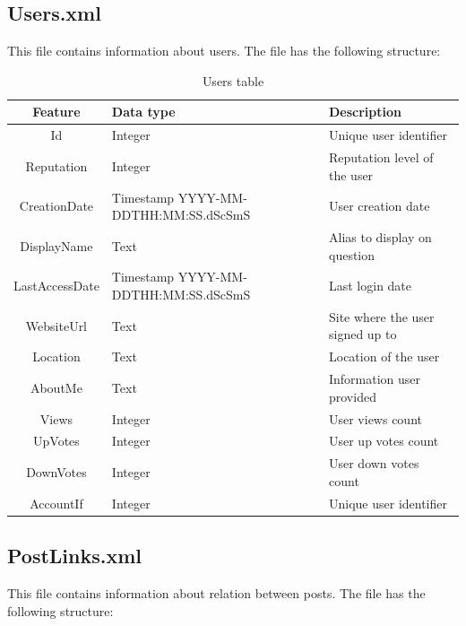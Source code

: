 \documentclass[11pt]{book} %
\begin{document}
    \subsection{Users.xml}

      This file contains information about users. The file has the following structure:

      \begin{table}[!ht]
        \begin{tabular}{|c|p{}|p{}|}
          \hline

          Feature & Data type & Description \\ \hline
          Id & Integer & Unique user identifier \\
          Reputation & Integer & Reputation level of the user \\ \hline
          CreationDate & Timestamp YYYY-MM-DDTHH:MM:SS.dScSmS & User creation date \\ \hline
          DisplayName & Text & Alias to display on question \\ \hline
          LastAccessDate & Timestamp YYYY-MM-DDTHH:MM:SS.dScSmS & Last login date \\ \hline
          WebsiteUrl & Text & Site where the user signed up to \\ \hline
          Location & Text & Location of the user \\ \hline
          AboutMe & Text & Information user provided \\ \hline
          Views & Integer & User views count \\ \hline
          UpVotes & Integer & User up votes count \\ \hline
          DownVotes & Integer & User down votes count \\ \hline
          AccountIf & Integer & Unique user identifier \\

          \hline
        \end{tabular}
        \caption{Users table}
        \label{tab:users}
      \end{table}

\newpage

    \subsection{PostLinks.xml}

      This file contains information about relation between posts. The file has the following structure:
\end{document}
